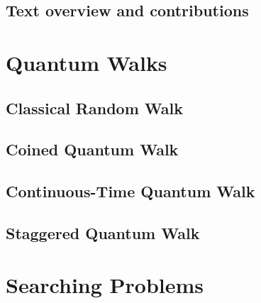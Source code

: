 \documentclass[
oneside,
11pt, a4paper,
footinclude=true,
headinclude=true,
cleardoublepage=empty
]{scrbook}
\begin{document}
\section{Text overview and contributions}


%
%

\chapter{Quantum Walks}\label{chap:QuantumWalks}
\section{Classical Random Walk}\label{sec:chap3ClassicalWalk}

\section{Coined Quantum Walk}\label{sec:chap3Coinedwalk}

\section{Continuous-Time Quantum Walk}\label{sec:chap3Contwalk}

\section{Staggered Quantum Walk}\label{sec:chap3StagWalk}


\chapter{Searching Problems}\label{chap:searchingProblems}
\end{document}

